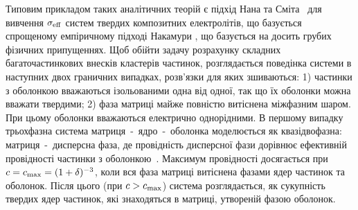 \documentclass[14pt,twoside]{vakthesis}
\begin{document}
Типовим прикладом таких аналітичних теорій є підхід Нана та Сміта~\cite{Nan1987, NanC.-W.1991, Nan1993} для вивчення $\sigma_{\rm eff}$ систем твердих композитних електролітів, що базується спрощеному емпіричному підході Накамури \cite{Nakamura1984}, що базується на досить грубих фізичних припущеннях.
Щоб обійти задачу розрахунку складних багаточастинкових внесків кластерів частинок, розглядається поведінка системи в наступних двох граничних випадках, розв'язки для яких зшиваються: 1) частинки з оболонкою вважаються ізольованими одна від одної, так що їх оболонки можна вважати твердими; 2) фаза матриці майже повністю витіснена міжфазним шаром. При цьому оболонки вважаються електрично однорідними. 
В першому випадку трьохфазна система матриця~-~ядро~-~оболонка моделюється як квазідвофазна: матриця~-~дисперсна фаза, де провідність дисперсної фази дорівнює ефективній провідності частинки з оболонкою~\cite{Maxwell1892, Brailsford1986, Chettiar2012}.
Максимум провідності досягається при  $c = c_{\rm max} = (1+\delta)^{-3}$, коли вся фаза матриці витіснена фазами ядер частинок та оболонок. 
Після цього (при $c > c_{\rm max}$) система розглядається, як сукупність твердих ядер частинок, які знаходяться в матриці, утвореній фазою оболонок. %
\end{document}
